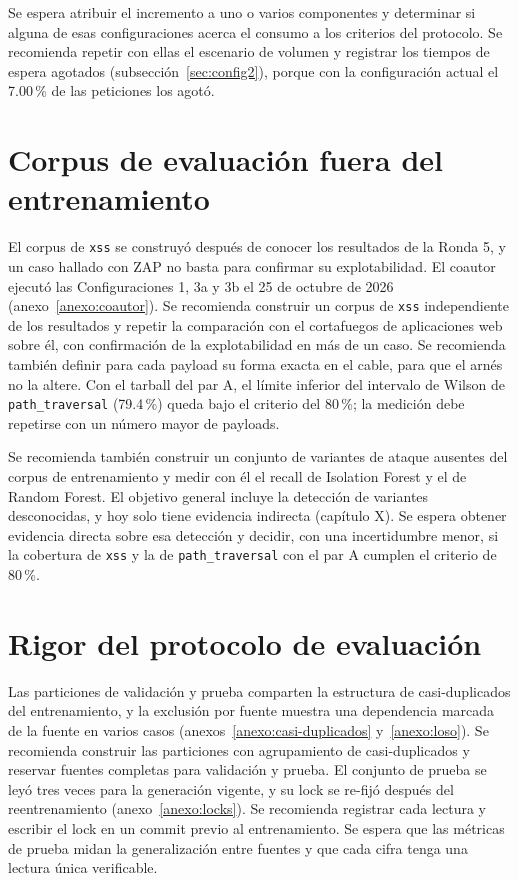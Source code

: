 Se espera atribuir el incremento a uno o varios componentes y determinar si alguna de esas configuraciones acerca el consumo a los criterios del protocolo. Se recomienda repetir con ellas el escenario de volumen y registrar los tiempos de espera agotados (subsección~\ref{sec:config2}), porque con la configuración actual el 7.00\,\% de las peticiones los agotó.

\section{Corpus de evaluación fuera del entrenamiento}

El corpus de \texttt{xss} se construyó después de conocer los resultados de la Ronda 5, y un caso hallado con ZAP no basta para confirmar su explotabilidad. El coautor ejecutó las Configuraciones 1, 3a y 3b el 25 de octubre de 2026 (anexo~\ref{anexo:coautor}). Se recomienda construir un corpus de \texttt{xss} independiente de los resultados y repetir la comparación con el cortafuegos de aplicaciones web sobre él, con confirmación de la explotabilidad en más de un caso. Se recomienda también definir para cada payload su forma exacta en el cable, para que el arnés no la altere. Con el tarball del par A, el límite inferior del intervalo de Wilson de \texttt{path\_traversal} (79.4\,\%) queda bajo el criterio del 80\,\%; la medición debe repetirse con un número mayor de payloads.

Se recomienda también construir un conjunto de variantes de ataque ausentes del corpus de entrenamiento y medir con él el recall de Isolation Forest y el de Random Forest. El objetivo general incluye la detección de variantes desconocidas, y hoy solo tiene evidencia indirecta (capítulo X). Se espera obtener evidencia directa sobre esa detección y decidir, con una incertidumbre menor, si la cobertura de \texttt{xss} y la de \texttt{path\_traversal} con el par A cumplen el criterio de 80\,\%.

\section{Rigor del protocolo de evaluación}

Las particiones de validación y prueba comparten la estructura de casi-duplicados del entrenamiento, y la exclusión por fuente muestra una dependencia marcada de la fuente en varios casos (anexos~\ref{anexo:casi-duplicados} y~\ref{anexo:loso}). Se recomienda construir las particiones con agrupamiento de casi-duplicados y reservar fuentes completas para validación y prueba. El conjunto de prueba se leyó tres veces para la generación vigente, y su lock se re-fijó después del reentrenamiento (anexo~\ref{anexo:locks}). Se recomienda registrar cada lectura y escribir el lock en un commit previo al entrenamiento. Se espera que las métricas de prueba midan la generalización entre fuentes y que cada cifra tenga una lectura única verificable.

